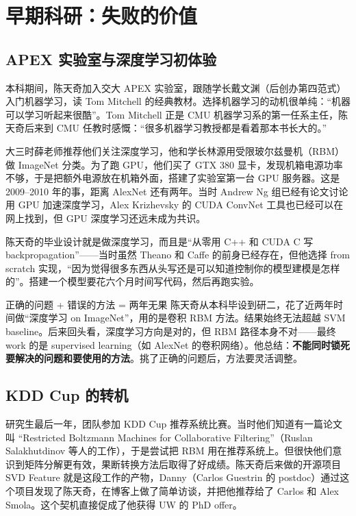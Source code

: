 \section{早期科研：失败的价值}

\subsection{APEX 实验室与深度学习初体验}

本科期间，陈天奇加入交大 APEX 实验室，跟随学长戴文渊（后创办第四范式）入门机器学习，读 Tom Mitchell 的经典教材。选择机器学习的动机很单纯：``机器可以学习听起来很酷''。Tom Mitchell 正是 CMU 机器学习系的第一任系主任，陈天奇后来到 CMU 任教时感慨：``很多机器学习教授都是看着那本书长大的。''

大三时薛老师推荐他们关注深度学习，他和学长林源用受限玻尔兹曼机（RBM）做 ImageNet 分类。为了跑 GPU，他们买了 GTX 380 显卡，发现机箱电源功率不够，于是把额外电源放在机箱外面，搭建了实验室第一台 GPU 服务器。这是 2009--2010 年的事，距离 AlexNet 还有两年。当时 Andrew Ng 组已经有论文讨论用 GPU 加速深度学习，Alex Krizhevsky 的 CUDA ConvNet 工具也已经可以在网上找到，但 GPU 深度学习还远未成为共识。

陈天奇的毕业设计就是做深度学习，而且是``从零用 C++ 和 CUDA C 写 backpropagation''------当时虽然 Theano 和 Caffe 的前身已经存在，但他选择 from scratch 实现，``因为觉得很多东西从头写还是可以知道控制你的模型建模是怎样的''。搭建一个模型要花六个月时间写代码，然后再跑实验。

\begin{warningbox}{正确的问题 + 错误的方法 = 两年无果}
陈天奇从本科毕设到研二，花了近两年时间做``深度学习 on ImageNet''，用的是卷积 RBM 方法。结果始终无法超越 SVM baseline。后来回头看，深度学习方向是对的，但 RBM 路径本身不对------最终 work 的是 supervised learning（如 AlexNet 的卷积网络）。他总结：\textbf{不能同时锁死要解决的问题和要使用的方法}。挑了正确的问题后，方法要灵活调整。
\end{warningbox}

\subsection{KDD Cup 的转机}

研究生最后一年，团队参加 KDD Cup 推荐系统比赛。当时他们知道有一篇论文叫 ``Restricted Boltzmann Machines for Collaborative Filtering''（Ruslan Salakhutdinov 等人的工作），于是尝试把 RBM 用在推荐系统上。但很快他们意识到矩阵分解更有效，果断转换方法后取得了好成绩。陈天奇后来做的开源项目 SVD Feature 就是这段工作的产物，Danny（Carlos Guestrin 的 postdoc）通过这个项目发现了陈天奇，在博客上做了简单访谈，并把他推荐给了 Carlos 和 Alex Smola。这个契机直接促成了他获得 UW 的 PhD offer。

